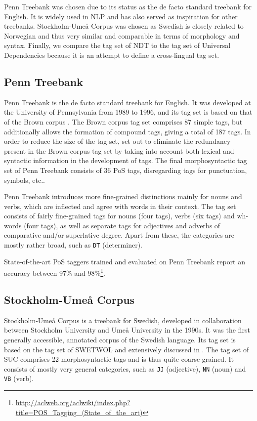 \documentclass[a4paper,12pt,english]{book}
\begin{document}
Penn Treebank was chosen due to its status as the de facto standard treebank
for English. It is widely used in NLP and has also served as inspiration for
other treebanks. Stockholm-Umeå Corpus was chosen as Swedish is closely related
to Norwegian and thus very similar and comparable in terms of morphology and
syntax. Finally, we compare the tag set of NDT to the tag set of Universal
Dependencies because it is an attempt to define a cross-lingual tag set.

\subsection{Penn Treebank}
Penn Treebank \cite{Mar:San:Mar:93} is the de facto standard treebank for
English. It was developed at the University of Pennsylvania from 1989 to 1996,
and its tag set is based on that of the Brown corpus \cite{Fra:Kuc:79}.  The
Brown corpus tag set comprises 87 simple tags, but additionally allows the
formation of compound tags, giving a total of 187 tags. In order to reduce the
size of the tag set,  set out to eliminate the redundancy
present in the Brown corpus tag set by taking into account both lexical and
syntactic information in the development of tags. The final morphosyntactic tag
set of Penn Treebank consists of 36 PoS tags, disregarding tags for
punctuation, symbols, etc..

Penn Treebank introduces more fine-grained distinctions mainly for nouns and
verbs, which are inflected and agree with words in their context. The tag set
consists of fairly fine-grained tags for nouns (four tags), verbs (six tags)
and wh-words (four tags), as well as separate tags for adjectives and adverbs
of comparative and/or superlative degree. Apart from these, the categories are
mostly rather broad, such as \texttt{DT} (determiner).

State-of-the-art PoS taggers trained and evaluated on Penn Treebank report an
accuracy between 97\% and
98\%\footnote{\url{http://aclweb.org/aclwiki/index.php?title=POS_Tagging_(State_of_the_art)}}.

\subsection{Stockholm-Umeå Corpus}
Stockholm-Umeå Corpus \cite{Gus:Har:06} is a treebank for Swedish, developed in
collaboration between Stockholm University and Umeå University in the 1990s. It
was the first generally accessible, annotated corpus of the Swedish language.
Its tag set is based on the tag set of SWETWOL \cite{Kar:92} and extensively
discussed in . The tag set of SUC comprises 22
morphosyntactic tags and is thus quite coarse-grained.  It consists of mostly
very general categories, such as \texttt{JJ} (adjective), \texttt{NN} (noun)
and \texttt{VB} (verb).
\end{document}
